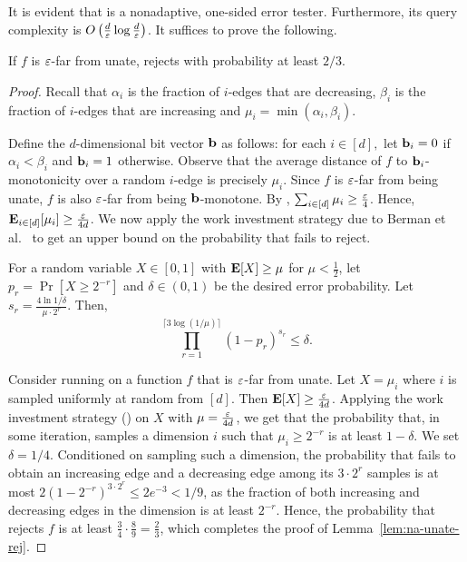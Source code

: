 It is evident that  is a nonadaptive, one-sided error tester. Furthermore,
its query complexity is $O\left(\frac{d}{\varepsilon}\log\frac{d}{\varepsilon}\right)$. It suffices to prove
the following.

\begin{lemma} \label{lem:na-unate-rej}
If $f$ is $\varepsilon$-far from unate,
	 rejects with probability at least $2/3$.
\end{lemma}

\begin{proof} Recall that $\alpha_i$ is the fraction of $i$-edges that are decreasing, $\beta_i$ is the fraction of $i$-edges that are increasing and $\mu_i = \min(\alpha_i,\beta_i).$
	
	
	Define the $d$-dimensional bit vector ${\bf b}$ as follows: for each $i\in [d],$ let ${\bf b}_i = 0$
	if $\alpha_i < \beta_i$ and $\mathbf{b}_i = 1$ otherwise.
	Observe that the average distance of $f$ to $\mathbf{b}_i$-monotonicity over a random $i$-edge is precisely $\mu_i$.
	Since $f$ is $\varepsilon$-far from being unate,
	$f$ is also $\varepsilon$-far from being ${\bf b}$-monotone.
	By , $\sum_{i \in [d]} \mu_i \geq \frac{\varepsilon} 4$. Hence, $\hbox{\bf E}_{i \in [d]}[\mu_i] \geq \frac{\varepsilon}{4d}$.
	We now apply the work investment strategy due to Berman et al.~\cite{BerRY14} to get an upper bound on the probability that  fails to reject.

\begin{theorem}\label{thm:wis}
For a random variable $X \in [0,1]$ with $\hbox{\bf E}[X] \geq \mu$ for $\mu < \frac 1 2$, let $p_r = \Pr[X \geq 2^{-r}]$ and $\delta \in (0,1)$ be the desired error probability. Let $s_r = \frac{4 \ln 1/\delta}{\mu \cdot 2^r}$. Then,
$$\prod\limits_{r=1}^{\lceil 3\log (1/\mu) \rceil} (1-p_r)^{s_r} \leq \delta. $$
\end{theorem}

\noindent Consider running  on a function $f$ that is $\varepsilon$-far from unate. Let $X = \mu_i$ where $i$ is sampled uniformly at random from $[d]$. Then $\hbox{\bf E}[X] \geq \frac{\varepsilon}{4d}$. Applying the work investment strategy () on $X$ with $\mu=\frac{\varepsilon}{4d}$, we get that the probability that, in some iteration,  samples a dimension $i$ such that $\mu_i\geq 2^{-r}$ is at least $1-\delta$.
We set $\delta = 1/4$.
Conditioned on sampling such a dimension, the probability that  fails to obtain an increasing edge and a decreasing edge among its $3 \cdot 2^r$ samples is at most $2\left(1-2^{-r}\right)^{3 \cdot 2^r} \leq 2e^{-3} < 1/9$, as the fraction of both increasing and decreasing edges in the dimension is at least $2^{-r}$.
Hence, the probability that  rejects $f$ is at least $\frac{3}{4} \cdot \frac{8}{9} = \frac{2}{3}$,
which completes the proof of Lemma~\ref{lem:na-unate-rej}.
\end{proof}

